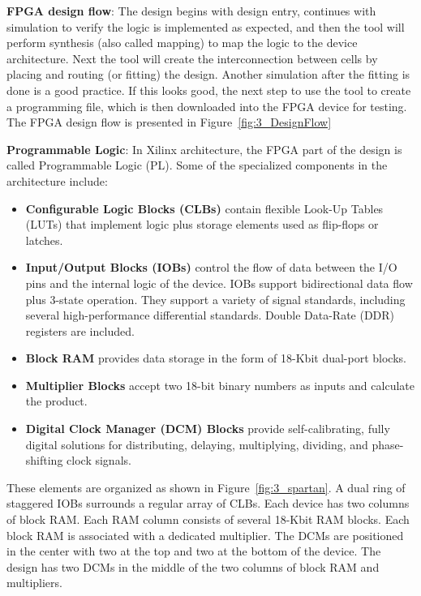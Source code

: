 
\noindent \textbf{FPGA design flow}: The design begins with design entry, continues with simulation to verify the logic is implemented as expected, and then the tool will perform synthesis (also called mapping) to map the logic to the device architecture. Next the tool will create the interconnection between cells by placing and routing (or fitting) the design. Another simulation after the fitting is done is a good practice. If this looks good, the next step to use the tool to create a programming file, which is then downloaded into the FPGA device for testing\cite{Coursera}. The FPGA design flow is presented in Figure~\ref{fig:3_DesignFlow} \\


\noindent \textbf{Programmable Logic}: In Xilinx architecture, the FPGA part of the design is called Programmable Logic (PL). Some of the specialized components in the architecture include:
\begin{itemize}
	\item \textbf{Configurable Logic Blocks (CLBs)} contain flexible Look-Up Tables (LUTs) that implement logic plus storage elements used as flip-flops or latches.
	\item \textbf{Input/Output Blocks (IOBs)} control the flow of data between the I/O pins and the internal logic of the device. IOBs support bidirectional data flow plus 3-state operation. They support a variety of signal standards, including several high-performance differential standards. Double Data-Rate (DDR) registers are included.
	\item \textbf{Block RAM} provides data storage in the form of 18-Kbit dual-port blocks.
	\item \textbf{Multiplier Blocks} accept two 18-bit binary numbers as inputs and calculate the product.
	\item \textbf{Digital Clock Manager (DCM) Blocks} provide self-calibrating, fully digital solutions for distributing, delaying, multiplying, dividing, and phase-shifting clock signals.
\end{itemize}

\noindent These elements are organized as shown in Figure~\ref{fig:3_spartan}. A dual ring of staggered IOBs surrounds a regular array of CLBs. Each device has two columns of block RAM. Each RAM column consists of several 18-Kbit RAM blocks. Each block RAM is associated with a dedicated multiplier. The DCMs are positioned in the center with two at the top and two at the bottom of the device. The design has two DCMs in the middle of the two columns of block RAM and multipliers. \\


